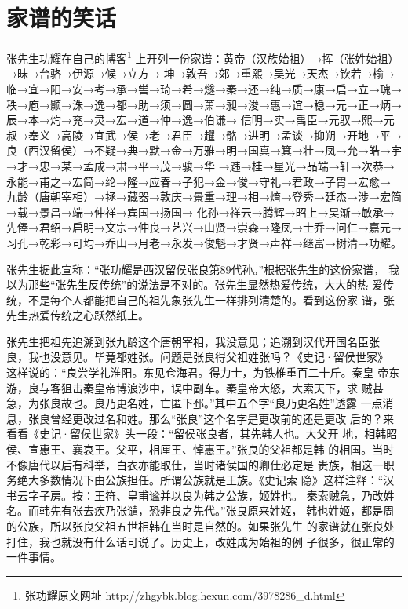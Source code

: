 \chapter{家谱的笑话}

\subtitle{——评张功耀的家谱}

张先生功耀在自己的博客\footnote{张功耀原文网址 http://zhgybk.blog.hexun.com/3978286\_d.html}
上开列一份家谱：黄帝（汉族始祖）→挥（张姓始祖）→昧→台骆→伊源→候→立方→
坤→敦吾→郊→重熙→吴光→天杰→钦若→榆→临→宜→阳→安→考→承→喾→琦→希→燧→秦→还→纯→质→康→启→立→瑰→
秩→庖→颢→洙→逸→都→助→须→圆→萧→昶→浚→惠→谊→稳→元→正→炳→辰→本→灼→兖→灵→宏→道→仲→逸→伯谦→
信明→实→禹臣→元驭→熙→元叔→奉义→高陵→宜武→侯→老→君臣→趯→骼→进明→孟谈→抑朔→开地→平→
良（西汉留侯）→不疑→典→默→金→万雅→明→国真→箕→壮→凤→允→皓→宇→才→忠→某→孟成→肃→平→茂→骏→华
→韪→桂→星光→品端→轩→次恭→永能→甫之→宏简→纶→隆→应春→子犯→金→俊→守礼→君政→子胄→宏愈→
九龄（唐朝宰相）→拯→藏器→敦庆→景重→理→相→焴→登秀→廷杰→涉→宏简→载→景昌→端→仲祥→宾国→扬国→
化孙→祥云→腾辉→昭上→昊渐→敏承→先俸→君绍→启明→文宗→仲良→艺兴→山贤→崇森→隆凤→士乔→问仁→嘉元→
习孔→乾彩→可均→乔山→月老→永发→俊魁→才贤→声祥→继富→树清→功耀。

张先生据此宣称：“张功耀是西汉留侯张良第89代孙。”根据张先生的这份家谱，
我以为那些“张先生反传统”的说法是不对的。张先生显然热爱传统，大大的热
爱传统，不是每个人都能把自己的祖先象张先生一样排列清楚的。看到这份家
谱，张先生热爱传统之心跃然纸上。

张先生把祖先追溯到张九龄这个唐朝宰相，我没意见；追溯到汉代开国名臣张
良，我也没意见。毕竟都姓张。问题是张良得父祖姓张吗？《史记·留侯世家》
这样说的：“良尝学礼淮阳。东见仓海君。得力士，为铁椎重百二十斤。秦皇
帝东游，良与客狙击秦皇帝博浪沙中，误中副车。秦皇帝大怒，大索天下，求
贼甚急，为张良故也。良乃更名姓，亡匿下邳。”其中五个字“良乃更名姓”透露
一点消息，张良曾经更改过名和姓。那么“张良”这个名字是更改前的还是更改
后的？来看看《史记·留侯世家》头一段：“留侯张良者，其先韩人也。大父开
地，相韩昭侯、宣惠王、襄哀王。父平，相厘王、悼惠王。”张良的父祖都是韩
的相国。当时不像唐代以后有科举，白衣亦能取仕，当时诸侯国的卿仕必定是
贵族，相这一职务绝大多数情况下由公族担任。所谓公族就是王族。《史记索
隐》这样注释：“汉书云字子房。按：王符、皇甫谧并以良为韩之公族，姬姓也。
秦索贼急，乃改姓名。而韩先有张去疾乃张谴，恐非良之先代。”张良原来姓姬，
韩也姓姬，都是周的公族，所以张良父祖五世相韩在当时是自然的。如果张先生
的家谱就在张良处打住，我也就没有什么话可说了。历史上，改姓成为始祖的例
子很多，很正常的一件事情。

